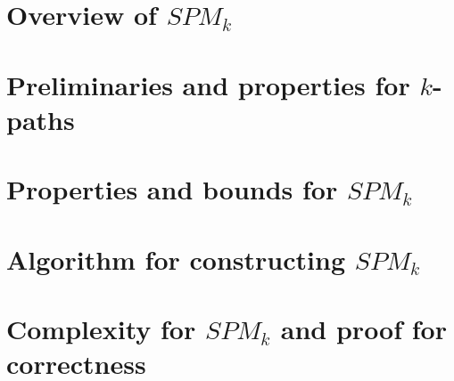 \section{Overview of $SPM_k$}

\section{Preliminaries and properties for $k$-paths}

\section{Properties and bounds for $SPM_k$}

\section{Algorithm for constructing $SPM_k$}

\section{Complexity for $SPM_k$ and proof for correctness}